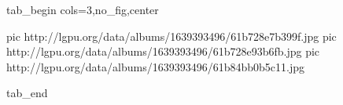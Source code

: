  
 
 
 
 


\ifcmt
  tab_begin cols=3,no_fig,center

     pic http://lgpu.org/data/albums/1639393496/61b728e7b399f.jpg
		 pic http://lgpu.org/data/albums/1639393496/61b728e93b6fb.jpg
		 pic http://lgpu.org/data/albums/1639393496/61b84bb0b5c11.jpg

  tab_end
\fi
